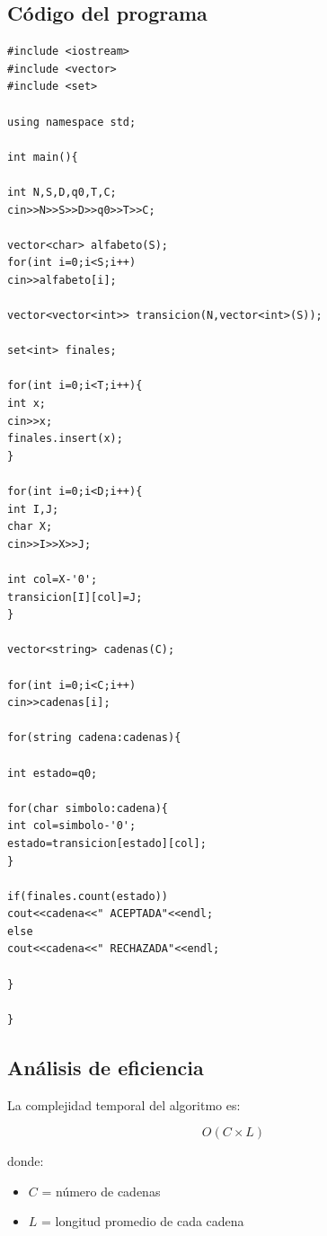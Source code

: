 \documentclass[12pt]{article}
\begin{document}
\subsection{Código del programa}

\begin{lstlisting}
#include <iostream>
#include <vector>
#include <set>

using namespace std;

int main(){

int N,S,D,q0,T,C;
cin>>N>>S>>D>>q0>>T>>C;

vector<char> alfabeto(S);
for(int i=0;i<S;i++)
cin>>alfabeto[i];

vector<vector<int>> transicion(N,vector<int>(S));

set<int> finales;

for(int i=0;i<T;i++){
int x;
cin>>x;
finales.insert(x);
}

for(int i=0;i<D;i++){
int I,J;
char X;
cin>>I>>X>>J;

int col=X-'0';
transicion[I][col]=J;
}

vector<string> cadenas(C);

for(int i=0;i<C;i++)
cin>>cadenas[i];

for(string cadena:cadenas){

int estado=q0;

for(char simbolo:cadena){
int col=simbolo-'0';
estado=transicion[estado][col];
}

if(finales.count(estado))
cout<<cadena<<" ACEPTADA"<<endl;
else
cout<<cadena<<" RECHAZADA"<<endl;

}

}
\end{lstlisting}

\newpage


\subsection{Análisis de eficiencia}

La complejidad temporal del algoritmo es:

\[
O(C \times L)
\]

donde:

\begin{itemize}

\item $C$ = número de cadenas
\item $L$ = longitud promedio de cada cadena

\end{itemize}
\end{document}
